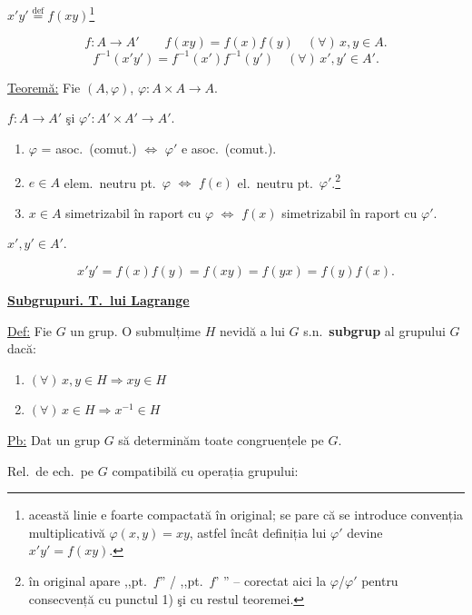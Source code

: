 \noindent [notație: $\varphi(x,y)=xy$] \quad $x'y' \overset{\text{def}}{=} f(xy)$\footnote{această linie e foarte compactată în original; se pare că se introduce convenția multiplicativă $\varphi(x,y)=xy$, astfel încât definiția lui $\varphi'$ devine $x'y'=f(xy)$.}

\[
f : A\to A' \qquad f(xy) = f(x)f(y) \quad (\forall)\,x,y\in A.
\]
\[
f^{-1}(x'y') = f^{-1}(x')f^{-1}(y') \quad (\forall)\,x',y'\in A'.
\]

\bigskip
\noindent\underline{Teoremă:} Fie $(A,\varphi)$, $\varphi:A\times A\to A$.

\noindent $f:A\to A'$ şi $\varphi':A'\times A'\to A'$.

\begin{enumerate}
\item[1)] $\varphi$ = asoc.\ (comut.) $\Leftrightarrow$ $\varphi'$ e asoc.\ (comut.).
\item[2)] $e\in A$ elem.\ neutru pt.\ $\varphi$ $\Leftrightarrow$ $f(e)$ el.\ neutru pt.\ $\varphi'$.\footnote{în original apare ,,pt.\ $f$'' / ,,pt.\ $f$' '' -- corectat aici la $\varphi$/$\varphi'$ pentru consecvență cu punctul 1) şi cu restul teoremei.}
\item[3)] $x\in A$ simetrizabil în raport cu $\varphi$ $\Leftrightarrow$ $f(x)$ simetrizabil în raport cu $\varphi'$.
\end{enumerate}

\noindent $x',y'\in A'$.

\[
x'y' = f(x)f(y) = f(xy) = f(yx) = f(y)f(x).
\]

\bigskip
\begin{center}
\end{center}

\noindent\underline{\textbf{Subgrupuri. T.\ lui Lagrange}}

\bigskip
\noindent\underline{Def:} Fie $G$ un grup. O submulțime $H$ nevidă a lui $G$ s.n.\ \textbf{subgrup} al grupului $G$ dacă:

\begin{enumerate}
\item[(1)] $(\forall)\,x,y\in H \Rightarrow xy\in H$
\item[(2)] $(\forall)\,x\in H \Rightarrow x^{-1}\in H$
\end{enumerate}

\bigskip
\noindent\underline{Pb:} Dat un grup $G$ să determinăm toate congruențele pe $G$.

\noindent Rel.\ de ech.\ pe $G$ compatibilă cu operația grupului:


